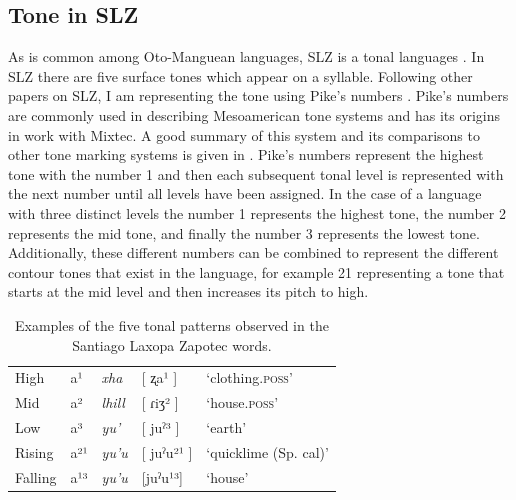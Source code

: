 \documentclass[12pt, letterpaper]{article}
\providecommand{\lsptoprule}{\midrule\toprule}
\providecommand{\lspbottomrule}{\bottomrule\midrule}
\begin{document}
\subsection{Tone in SLZ} \label{sec:Tone}

As is common among Oto-Manguean languages, SLZ is a tonal languages \citep{suarezMesoamericanIndianLanguages1983,campbellMesoAmericaLinguisticArea1986,silvermanLaryngealComplexityOtomanguean1997,campbellOtomangueanHistoricalLinguistics2017a,campbellOtomangueanHistoricalLinguistics2017}. In SLZ there are five surface tones which appear on a syllable. Following other papers on SLZ, I am representing the tone using Pike's numbers \citep[e.g.][]{sichelFeaturalLifeNominals2020}. Pike's numbers are commonly used in describing Mesoamerican tone systems and has its origins in  work with Mixtec. A good summary of this system and its comparisons to other tone marking systems is given in \citet{weePhonologicalTone2019}. Pike's numbers represent the highest tone with the number 1 and then each subsequent tonal level is represented with the next number until all levels have been assigned. In the case of a language with three distinct levels the number 1 represents the highest tone, the number 2 represents the mid tone, and finally the number 3 represents the lowest tone. Additionally, these different numbers can be combined to represent the different contour tones that exist in the language, for example 21 representing a tone that starts at the mid level and then increases its pitch to high. 


\begin{table}[!h]
	\centering
	\caption{Examples of the five tonal patterns observed in the Santiago Laxopa Zapotec words.}
	\label{tab:tones}
	 \begin{tabular}{lllll}
	  \lsptoprule
	  High   	&  a¹  &  \textit{xha}   &  [ ʐa¹ ] & `clothing.\textsc{poss}'\\
		Mid    	&  a²  &  \textit{lhill} 	& [ ɾiʒ² ] & `house.\textsc{poss}' \\
		Low   	&  a³  &  \textit{yu'} 	&	 [ juˀ³ ] & `earth'\\
		Rising	&  a²¹  &  \textit{yu'u} 	&	[ juˀu²¹ ] & `quicklime (Sp. cal)' \\
		Falling &  a¹³  &  \textit{yu'u}  &	[juˀu¹³] &	`house' \\
	  \lspbottomrule
	 \end{tabular}
\end{table}
\end{document}
